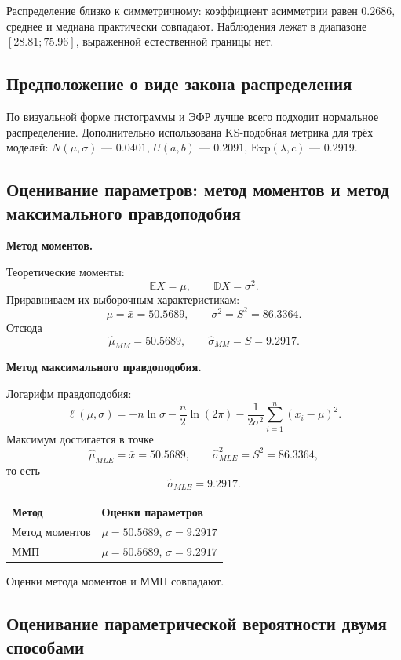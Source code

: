 \documentclass[12pt,a4paper]{article}
\begin{document}
Распределение близко к симметричному: коэффициент асимметрии равен $0.2686$, среднее и медиана практически совпадают. Наблюдения лежат в диапазоне $[28.81; 75.96]$, выраженной естественной границы нет.

\subsection{Предположение о виде закона распределения}

По визуальной форме гистограммы и ЭФР лучше всего подходит нормальное распределение. Дополнительно использована KS-подобная метрика для трёх моделей: $N(\mu, \sigma)$ --- $0.0401$, $U(a,b)$ --- $0.2091$, $\mathrm{Exp}(\lambda,c)$ --- $0.2919$.

\subsection{Оценивание параметров: метод моментов и метод максимального правдоподобия}

\textbf{Метод моментов.}

Теоретические моменты:
\[
\mathbb{E}X = \mu, \qquad \mathbb{D}X = \sigma^2.
\]
Приравниваем их выборочным характеристикам:
\[
\mu = \bar{x} = 50.5689, \qquad \sigma^2 = S^2 = 86.3364.
\]
Отсюда
\[
\hat{\mu}_{MM} = 50.5689, \qquad \hat{\sigma}_{MM} = S = 9.2917.
\]

\textbf{Метод максимального правдоподобия.}

Логарифм правдоподобия:
\[
\ell(\mu,\sigma) = -n\ln\sigma - \frac{n}{2}\ln(2\pi) - \frac{1}{2\sigma^2}\sum_{i=1}^{n}(x_i-\mu)^2.
\]
Максимум достигается в точке
\[
\hat{\mu}_{MLE} = \bar{x} = 50.5689, \qquad \hat{\sigma}_{MLE}^2 = S^2 = 86.3364,
\]
то есть
\[
\hat{\sigma}_{MLE} = 9.2917.
\]

\begin{center}
\begin{tabular}{>{\raggedright\arraybackslash}p{}p{}}
\toprule
Метод & Оценки параметров \\
\midrule
Метод моментов & $\mu = 50.5689$, $\sigma = 9.2917$ \\
ММП & $\mu = 50.5689$, $\sigma = 9.2917$ \\
\bottomrule
\end{tabular}
\end{center}

Оценки метода моментов и ММП совпадают.

\subsection{Оценивание параметрической вероятности двумя способами}
\end{document}
